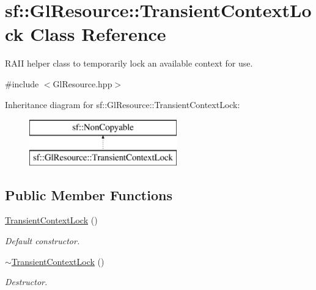 \hypertarget{classsf_1_1_gl_resource_1_1_transient_context_lock}{}\section{sf\+:\+:Gl\+Resource\+:\+:Transient\+Context\+Lock Class Reference}
\label{classsf_1_1_gl_resource_1_1_transient_context_lock}


R\+A\+II helper class to temporarily lock an available context for use.  




{\ttfamily \#include $<$Gl\+Resource.\+hpp$>$}

Inheritance diagram for sf\+:\+:Gl\+Resource\+:\+:Transient\+Context\+Lock\+:\begin{figure}[H]
\begin{center}
\leavevmode
\includegraphics[height=2.000000cm]{classsf_1_1_gl_resource_1_1_transient_context_lock}
\end{center}
\end{figure}
\subsection*{Public Member Functions}
\begin{DoxyCompactItemize}
\item 
\mbox{\label{classsf_1_1_gl_resource_1_1_transient_context_lock_a6434ee8f0380c300b361be038f37123a}} 
\hyperlink{classsf_1_1_gl_resource_1_1_transient_context_lock_a6434ee8f0380c300b361be038f37123a}{Transient\+Context\+Lock} ()
\begin{DoxyCompactList}\small\item\em Default constructor. \end{DoxyCompactList}\item 
\mbox{\label{classsf_1_1_gl_resource_1_1_transient_context_lock_a169285281b252ac8d54523b0fcc4b814}} 
\hyperlink{classsf_1_1_gl_resource_1_1_transient_context_lock_a169285281b252ac8d54523b0fcc4b814}{$\sim$\+Transient\+Context\+Lock} ()
\begin{DoxyCompactList}\small\item\em Destructor. \end{DoxyCompactList}\end{DoxyCompactItemize}


